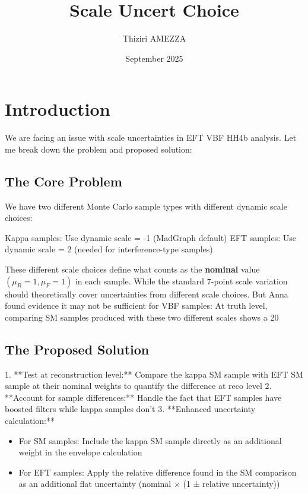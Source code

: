 \documentclass{article}
\title{Scale Uncert Choice}
\author{Thiziri AMEZZA}
\date{September 2025}
\begin{document}
\maketitle

\section{Introduction}

We are facing an issue with scale uncertainties in EFT VBF HH4b analysis. Let me break down the problem and proposed solution:

\subsection{\textbf{The Core Problem}}

We have two different Monte Carlo sample types with different dynamic scale choices:

Kappa samples: Use dynamic scale = -1 (MadGraph default)
EFT samples: Use dynamic scale = 2 (needed for interference-type samples)


These different scale choices define what counts as the \textbf{nominal} value $(\mu_R = 1, \mu_F=1)$ in each sample. While the standard 7-point scale variation should theoretically cover uncertainties from different scale choices. But Anna found evidence it may not be sufficient for VBF samples: At truth level, comparing SM samples produced with these two different scales shows a 20%


\subsection{\textbf{The Proposed Solution}}

1.  **Test at reconstruction level:** Compare the kappa SM sample with EFT SM sample at their nominal weights to quantify the difference at reco level
2. **Account for sample differences:** Handle the fact that EFT samples have boosted filters while kappa samples don't
3.  **Enhanced uncertainty calculation:**

\begin{itemize}
    \item For SM samples: Include the kappa SM sample directly as an additional weight in the envelope calculation
    \item For EFT samples: Apply the relative difference found in the SM comparison as an additional flat uncertainty (nominal × (1 ± relative uncertainty))
\end{itemize}
\end{document}
